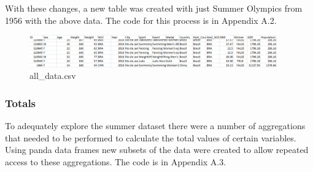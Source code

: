 \documentclass[a4 paper, 12pt]{article}
\begin{document}
    With these changes, a new table was created with just Summer Olympics from 1956 with the above data. The code for this process is in Appendix A.2.      
        \begin{figure} [H]
            \centering
            \includegraphics[width=0.95\textwidth, frame]
                {./images/data/all_data.png}      
                \caption{all\_data.csv} 
        \end{figure}

    \subsubsection{Totals}
    To adequately explore the summer dataset there were a number of aggregations that needed to be performed to calculate the total values of certain variables. Using panda data frames new subsets of the data were created to allow repeated access to these aggregations. The code is in Appendix A.3.
\end{document}
